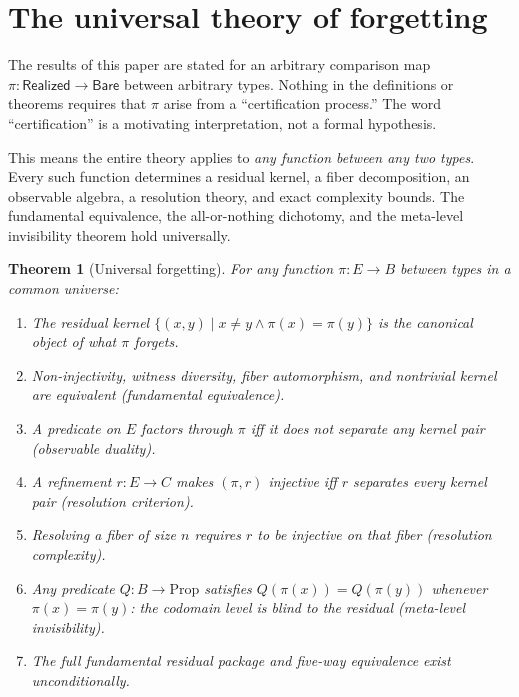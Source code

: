 \documentclass[11pt,a4paper]{article}
\theoremstyle{plain}
\newtheorem{theorem}{Theorem}[section]
\theoremstyle{definition}
\theoremstyle{remark}
\newcommand{\Bare}{\mathsf{Bare}}
\newcommand{\Real}{\mathsf{Realized}}
\newcommand{\compare}{\pi}
\begin{document}
\section{The universal theory of forgetting}\label{sec:universal}

The results of this paper are stated for an arbitrary comparison map
$\compare : \Real \to \Bare$ between arbitrary types. Nothing in the
definitions or theorems requires that $\compare$ arise from a ``certification
process.'' The word ``certification'' is a motivating interpretation, not a
formal hypothesis.

This means the entire theory applies to \emph{any function between any two
types}. Every such function determines a residual kernel, a fiber
decomposition, an observable algebra, a resolution theory, and exact
complexity bounds. The fundamental equivalence, the all-or-nothing dichotomy,
and the meta-level invisibility theorem hold universally.

\begin{theorem}[Universal forgetting]\label{thm:universal-forget}
For any function $\pi : E \to B$ between types in a common universe:
\begin{enumerate}[label=(\roman*),nosep]
\item The residual kernel
      $\{(x,y) \mid x \neq y \land \pi(x) = \pi(y)\}$ is the canonical
      object of what $\pi$ forgets.
\item Non-injectivity, witness diversity, fiber automorphism, and nontrivial
      kernel are equivalent (fundamental equivalence).
\item A predicate on $E$ factors through $\pi$ iff it does not separate any
      kernel pair (observable duality).
\item A refinement $r : E \to C$ makes $(\pi, r)$ injective iff $r$
      separates every kernel pair (resolution criterion).
\item Resolving a fiber of size $n$ requires $r$ to be injective on that
      fiber (resolution complexity).
\item Any predicate $Q : B \to \mathrm{Prop}$ satisfies
      $Q(\pi(x)) = Q(\pi(y))$ whenever $\pi(x) = \pi(y)$: the codomain
      level is blind to the residual (meta-level invisibility).
\item The full fundamental residual package and five-way equivalence exist
      unconditionally.
\end{enumerate}
\end{theorem}
\end{document}
